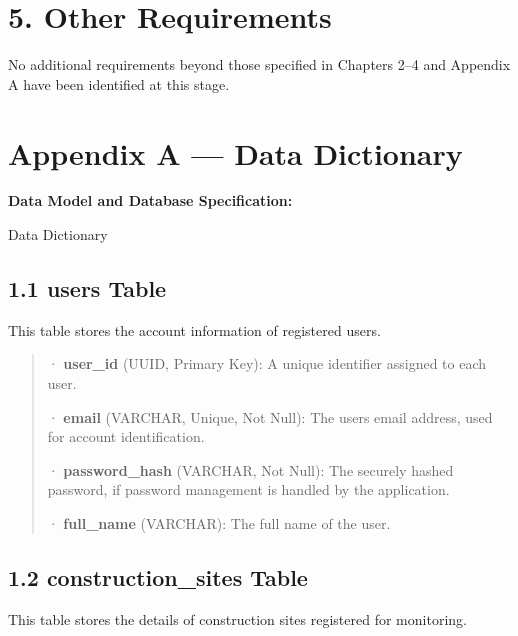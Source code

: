 \documentclass[12pt,a4paper]{report}
\newcommand{\chapterlabel}{}
\begin{document}
\renewcommand{\chapterlabel}{Chapter 5}
\chapter{5. Other Requirements}\label{other-requirements}

No additional requirements beyond those specified in Chapters 2--4 and
Appendix A have been identified at this stage.

\renewcommand{\chapterlabel}{}
\chapter{Appendix A --- Data
Dictionary}\label{appendix-a-data-dictionary}

\textbf{Data Model and Database Specification:}

Data Dictionary

\section{1.1 users Table}\label{users-table}

This table stores the account information of registered users.

\begin{quote}
· \textbf{user\_id} (UUID, Primary Key): A unique identifier assigned to
each user.

· \textbf{email} (VARCHAR, Unique, Not Null): The user\textquotesingle s
email address, used for account identification.

· \textbf{password\_hash} (VARCHAR, Not Null): The securely hashed
password, if password management is handled by the application.

· \textbf{full\_name} (VARCHAR): The full name of the user.
\end{quote}

\section{1.2 construction\_sites
Table}\label{construction_sites-table}

This table stores the details of construction sites registered for
monitoring.
\end{document}
